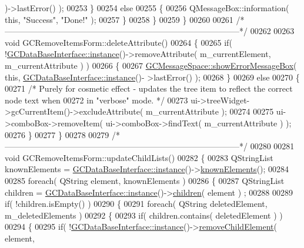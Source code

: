 \begin{DoxyCode}
{      )->lastError() );
00253     \}
00254     \textcolor{keywordflow}{else}
00255     \{
00256       QMessageBox::information( \textcolor{keyword}{this}, \textcolor{stringliteral}{"Success"}, \textcolor{stringliteral}{"Done!"} );
00257     \}
00258   \}
00259 \}
00260 
00261 \textcolor{comment}{/*
      --------------------------------------------------------------------------------------*/}
00262 
00263 \textcolor{keywordtype}{void} GCRemoveItemsForm::deleteAttribute()
00264 \{
00265   \textcolor{keywordflow}{if}( !\hyperlink{class_g_c_data_base_interface_a1baea9c0667aa8b610ec30076fcab84c}{GCDataBaseInterface::instance}()->removeAttribute( m\_currentElement, 
      m\_currentAttribute ) )
00266   \{
00267     \hyperlink{namespace_g_c_message_space_ab118b3a133686167617eb955029fd44e}{GCMessageSpace::showErrorMessageBox}( \textcolor{keyword}{this}, \hyperlink{class_g_c_data_base_interface_a1baea9c0667aa8b610ec30076fcab84c}{GCDataBaseInterface::instance}()-
      >lastError() );
00268   \}
00269   \textcolor{keywordflow}{else}
00270   \{
00271     \textcolor{comment}{/* Purely for cosmetic effect - updates the tree item to reflect the
       correct node text when}
00272 \textcolor{comment}{      in "verbose" mode. */}
00273     ui->treeWidget->gcCurrentItem()->excludeAttribute( m\_currentAttribute );
00274 
00275     ui->comboBox->removeItem( ui->comboBox->findText( m\_currentAttribute ) );
00276   \}
00277 \}
00278 
00279 \textcolor{comment}{/*
      --------------------------------------------------------------------------------------*/}
00280 
00281 \textcolor{keywordtype}{void} GCRemoveItemsForm::updateChildLists()
00282 \{
00283   QStringList knownElements = \hyperlink{class_g_c_data_base_interface_a1baea9c0667aa8b610ec30076fcab84c}{GCDataBaseInterface::instance}()->\hyperlink{class_g_c_data_base_interface_a6c4eabd4f39a1c23ab320bb0dbc855d4}{knownElements}();
00284 
00285   \textcolor{keywordflow}{foreach}( QString element, knownElements )
00286   \{
00287     QStringList children = \hyperlink{class_g_c_data_base_interface_a1baea9c0667aa8b610ec30076fcab84c}{GCDataBaseInterface::instance}()->\hyperlink{class_g_c_data_base_interface_aab5126783bc3acc7c718c8ffd8af62bc}{children}( element )
      ;
00288 
00289     \textcolor{keywordflow}{if}( !children.isEmpty() )
00290     \{
00291       \textcolor{keywordflow}{foreach}( QString deletedElement, m\_deletedElements )
00292       \{
00293         \textcolor{keywordflow}{if}( children.contains( deletedElement ) )
00294         \{
00295           \textcolor{keywordflow}{if}( !\hyperlink{class_g_c_data_base_interface_a1baea9c0667aa8b610ec30076fcab84c}{GCDataBaseInterface::instance}()->\hyperlink{class_g_c_data_base_interface_a657f2885b6741f8ac229939f77e7dd73}{removeChildElement}( element, 
}
\end{DoxyCode}
